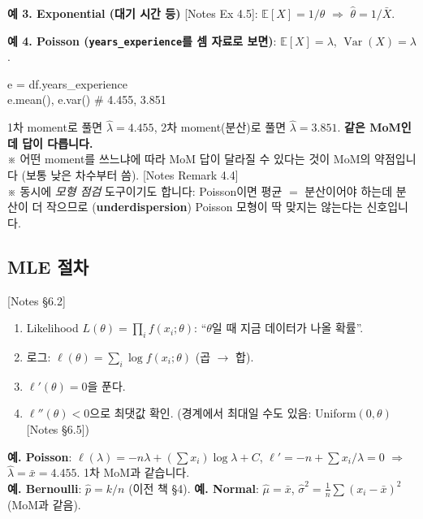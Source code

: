 \documentclass[11pt,a4paper]{article}
\newcommand{\E}{\mathbb{E}}
\newcommand{\Var}{\operatorname{Var}}
\newcommand{\term}[1]{\textbf{#1}}
\newcommand{\code}[1]{\texttt{#1}}
\newcommand{\nref}[1]{{\footnotesize\textsf{\color{blue!55!black}[Notes #1]}}}
\newcommand{\aside}[1]{{\footnotesize\color{black!65}#1}}
\begin{document}
\textbf{예 3. Exponential (대기 시간 등)} \nref{Ex 4.5}: $\E[X]=1/\theta$ $\Rightarrow$ $\hat\theta=1/\bar X$.

\textbf{예 4. Poisson (\code{years\_experience}를 셈 자료로 보면)}: $\E[X]=\lambda$, $\Var(X)=\lambda$.
\begin{codebox}
e = df.years\_experience\\
e.mean(), e.var() \hfill \# 4.455, 3.851
\end{codebox}
1차 moment로 풀면 $\hat\lambda=4.455$, 2차 moment(분산)로 풀면 $\hat\lambda=3.851$. \textbf{같은 MoM인데 답이 다릅니다.}\\
\aside{※ 어떤 moment를 쓰느냐에 따라 MoM 답이 달라질 수 있다는 것이 MoM의 약점입니다 (보통 낮은 차수부터 씀). \nref{Remark 4.4}}\\
\aside{※ 동시에 \emph{모형 점검} 도구이기도 합니다: Poisson이면 평균 $=$ 분산이어야 하는데 분산이 더 작으므로 (\term{underdispersion}) Poisson 모형이 딱 맞지는 않는다는 신호입니다.}

\subsection{MLE 절차} \nref{§6.2}
\begin{enumerate}
\item Likelihood $L(\theta)=\prod_i f(x_i;\theta)$: ``$\theta$일 때 지금 데이터가 나올 확률''.
\item 로그: $\ell(\theta)=\sum_i\log f(x_i;\theta)$ (곱 $\to$ 합).
\item $\ell'(\theta)=0$을 푼다.
\item $\ell''(\theta)<0$으로 최댓값 확인. (경계에서 최대일 수도 있음: Uniform$(0,\theta)$ \nref{§6.5})
\end{enumerate}

\textbf{예. Poisson}: $\ell(\lambda)=-n\lambda+(\sum x_i)\log\lambda+C$, $\ell'=-n+\sum x_i/\lambda=0$ $\Rightarrow$ $\hat\lambda=\bar x=4.455$. 1차 MoM과 같습니다.\\
\textbf{예. Bernoulli}: $\hat p=k/n$ (이전 책 §4). \textbf{예. Normal}: $\hat\mu=\bar x$, $\hat\sigma^2=\frac1n\sum(x_i-\bar x)^2$ (MoM과 같음).
\end{document}
